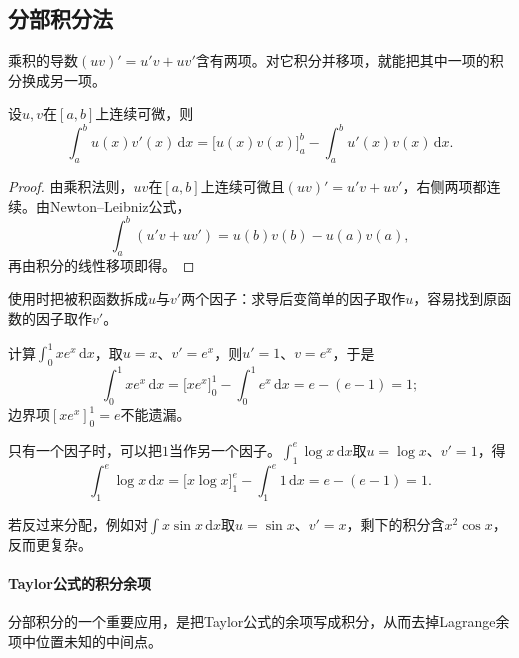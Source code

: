 \subsection{分部积分法}
\label{sec:ru-integration-by-parts}

乘积的导数$(uv)'=u'v+uv'$含有两项。对它积分并移项，就能把其中一项的积分换成另一项。
\begin{theorem}[分部积分公式]
\label{thm:ru-integration-by-parts}
设$u,v$在$[a,b]$上连续可微，则
\begin{equation}
 \int_a^bu(x)v'(x)\,\mathrm dx=\bigl[u(x)v(x)\bigr]_a^b-\int_a^bu'(x)v(x)\,\mathrm dx.
 \label{eq:ru-integration-by-parts}
\end{equation}
\BookEquationAliases{\label{eq:analysis-integration-by-parts}}
\end{theorem}
\begin{proof}
由乘积法则，$uv$在$[a,b]$上连续可微且$(uv)'=u'v+uv'$，右侧两项都连续。由Newton--Leibniz公式，
\[
 \int_a^b(u'v+uv')=u(b)v(b)-u(a)v(a),
\]
再由积分的线性移项即得。
\end{proof}

使用时把被积函数拆成$u$与$v'$两个因子：求导后变简单的因子取作$u$，容易找到原函数的因子取作$v'$。


\begin{example}[分部积分的两个算例]
\label{ex:ru-integration-by-parts}
计算$\int_0^1xe^x\,\mathrm dx$，取$u=x$、$v'=e^x$，则$u'=1$、$v=e^x$，于是
\[
 \int_0^1xe^x\,\mathrm dx=\bigl[xe^x\bigr]_0^1-\int_0^1e^x\,\mathrm dx=e-(e-1)=1;
\]
边界项$[xe^x]_0^1=e$不能遗漏。

只有一个因子时，可以把$1$当作另一个因子。$\int_1^e\log x\,\mathrm dx$取$u=\log x$、$v'=1$，得
\[
 \int_1^e\log x\,\mathrm dx=\bigl[x\log x\bigr]_1^e-\int_1^e1\,\mathrm dx=e-(e-1)=1.
\]
\end{example}
若反过来分配，例如对$\int x\sin x\,\mathrm dx$取$u=\sin x$、$v'=x$，剩下的积分含$x^2\cos x$，反而更复杂。

\paragraph{Taylor公式的积分余项}
分部积分的一个重要应用，是把Taylor公式的余项写成积分，从而去掉Lagrange余项中位置未知的中间点。

